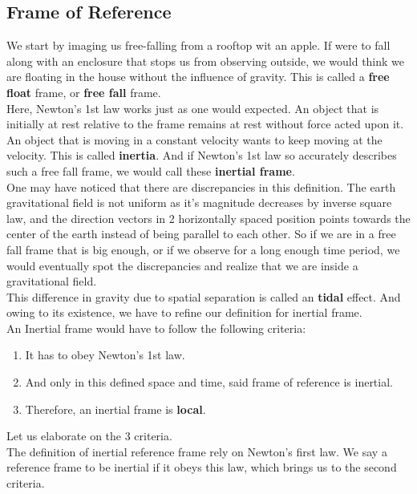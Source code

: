 \documentclass[12pt]{book}
\begin{document}
\subsection{Frame of Reference}
We start by imaging us free-falling from a rooftop wit an apple. If were to fall along with an enclosure that stops us from observing outside, we would think we are floating in the house without the influence of gravity. This is called a \textbf{free float} frame, or \textbf{free fall} frame.\\
\newline
Here, Newton's 1st law works just as one would expected. An object that is initially at rest relative to the frame remains at rest without force acted upon it. An object that is moving in a constant velocity wants to keep moving at the velocity. This is called \textbf{inertia}. And if Newton's 1st law so accurately describes such a free fall frame, we would call these \textbf{inertial frame}. 
\\
\newline
One may have noticed that there are discrepancies in this definition. The earth gravitational field is not uniform as it's magnitude decreases by inverse square law, and the direction vectors in 2 horizontally spaced position points towards the center of the earth instead of being parallel to each other. So if we are in a free fall frame that is big enough, or if we observe for a long enough time period, we would eventually spot the discrepancies and realize that we are inside a gravitational field. \\
\newline
This difference in gravity due to spatial separation is called an \textbf{tidal} effect. And owing to its existence, we have to refine our definition for inertial frame. \\
\newline
An Inertial frame would have to follow the following criteria:\\
\begin{enumerate}
    \item It has to obey Newton's 1st law.
    \item And only in this defined space and time, said frame of reference is inertial.
    \item Therefore, an inertial frame is \textbf{local}.
\end{enumerate}
Let us elaborate on the 3 criteria.\\
\newline
The definition of inertial reference frame rely on Newton's first law. We say a reference frame to be inertial if it obeys this law, which brings us to the second criteria.\\
\end{document}
